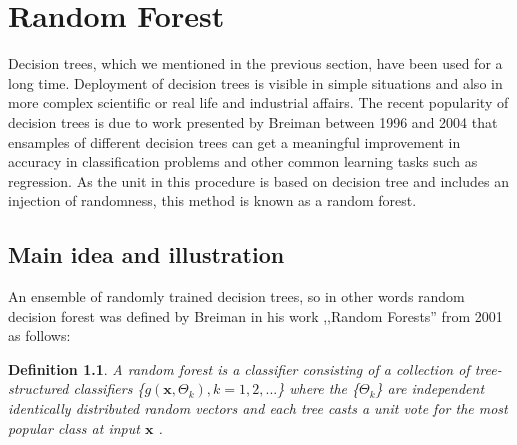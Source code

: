 \chapter{Random Forest}
Decision trees, which we mentioned in the previous section, have been used for a long time. Deployment of decision trees is visible in simple situations and also in more complex scientific or real life and industrial affairs. The recent popularity of decision trees is due to work presented by Breiman between 1996 and 2004 that ensamples of different decision trees can get a meaningful improvement in accuracy in classification problems and other common learning tasks such as regression. As the unit in this procedure is based on decision tree and includes an injection of randomness, this method is known as a random forest. 

\section{Main idea and illustration}
An ensemble of randomly trained decision trees, so in other words random decision forest was defined by Breiman in his work ,,Random Forests”  from 2001 as follows:

\newtheorem{theorem}{Definition}
\begin{theorem}
A random forest is a classifier consisting of a collection of tree-structured classifiers \{${g(\textbf{x},\Theta_{k})}, k = 1,2,...$\} where the \{$\Theta_{k}$\} are independent identically
distributed random vectors and each tree casts a unit vote for the most popular class at input $\textbf{x}$ .
\end{theorem}
